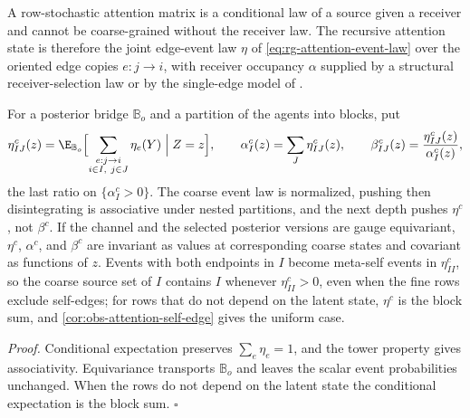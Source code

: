 A row-stochastic attention matrix is a conditional law of a source given a receiver
and cannot be coarse-grained without the receiver law. The recursive attention state
is therefore the joint edge-event law $\eta$ of \eqref{eq:rg-attention-event-law}
over the oriented edge copies $e:j\to i$, with receiver occupancy $\alpha$ supplied
by a structural receiver-selection law or by the single-edge model of
.

For a posterior bridge $\mathbb B_o$ and a partition of the agents into blocks, put
\begin{equation}
\eta^c_{IJ}(z)
=\E_{\mathbb B_o}\Bigl[\sum_{\substack{e:j\to i\\ i\in I,\ j\in J}}\eta_e(Y)\Bigm|Z=z\Bigr],
\qquad
\alpha^c_I(z)=\sum_J\eta^c_{IJ}(z),
\qquad
\beta^c_{IJ}(z)=\frac{\eta^c_{IJ}(z)}{\alpha^c_I(z)},
\label{eq:rg-meta-attention}
\end{equation}
the last ratio on $\{\alpha^c_I>0\}$. The coarse event law is normalized, pushing
then disintegrating is associative under nested partitions, and the next depth
pushes $\eta^c$, not $\beta^c$. If the channel and the selected posterior versions
are gauge equivariant, $\eta^c$, $\alpha^c$, and $\beta^c$ are invariant as values at
corresponding coarse states and covariant as functions of $z$. Events with both
endpoints in $I$ become meta-self events in $\eta^c_{II}$, so the coarse source set
of $I$ contains $I$ whenever $\eta^c_{II}>0$, even when the fine rows exclude
self-edges; for rows that do not depend on the latent state, $\eta^c$ is the block
sum, and \cref{cor:obs-attention-self-edge} gives the uniform case.

\noindent\emph{Proof.}
Conditional expectation preserves $\sum_e\eta_e=1$, and the tower property gives
associativity. Equivariance transports $\mathbb B_o$ and leaves the scalar event
probabilities unchanged. When the rows do not depend on the latent state the
conditional expectation is the block sum. $\square$

